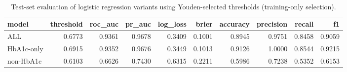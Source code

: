 \begin{table}[H]
\begin{center}
\begin{tabular}{lrrrrrrrrr}
\toprule
model & threshold & roc_auc & pr_auc & log_loss & brier & accuracy & precision & recall & f1 \\
\midrule
ALL & 0.6773 & 0.9361 & 0.9678 & 0.3409 & 0.1001 & 0.8945 & 0.9751 & 0.8458 & 0.9059 \\
HbA1c-only & 0.6915 & 0.9352 & 0.9676 & 0.3449 & 0.1013 & 0.9126 & 1.0000 & 0.8544 & 0.9215 \\
non-HbA1c & 0.6103 & 0.6626 & 0.7430 & 0.6315 & 0.2211 & 0.5986 & 0.7238 & 0.5352 & 0.6153 \\
\bottomrule
\end{tabular}
\end{center}
\vspace{-5pt}
\caption{Test-set evaluation of logistic regression variants using Youden-selected thresholds (training-only selection).}
\label{tab:logit_test_eval_youden}
\end{table}

